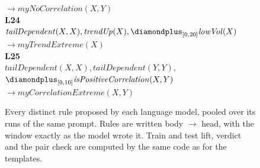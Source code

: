 \begin{figure}[t]
{\begin{minipage}{0.95\textwidth}
\hspace*{1.5em}\hspace*{3em}\mbox{$\to \mathit{myNoCorrelation}(X,Y)$}\\[4pt]
\textbf{L24}\\
\hspace*{1.5em}\mbox{$\mathit{tailDependent}(X,X), \mathit{trendUp}(X), \diamondplus_{[0,20]} \mathit{lowVol}(X)$}\\
\hspace*{1.5em}\hspace*{3em}\mbox{$\to \mathit{myTrendExtreme}(X)$}\\[4pt]
\textbf{L25}\\
\hspace*{1.5em}\mbox{$\mathit{tailDependent}(X,X), \mathit{tailDependent}(Y,Y),$}\\
\hspace*{1.5em}\hspace*{1.5em}\mbox{$\diamondplus_{[0,10]} \mathit{isPositiveCorrelation}(X,Y)$}\\
\hspace*{1.5em}\hspace*{3em}\mbox{$\to \mathit{myCorrelationExtreme}(X,Y)$}
\end{minipage}}
\caption{Every distinct rule proposed by each language model, pooled over its runs of the same prompt. Rules are written body $\to$ head, with the window exactly as the model wrote it. Train and test lift, verdict and the pair check are computed by the same code as for the templates.}
\label{fig:llm-rules}
\end{figure}
